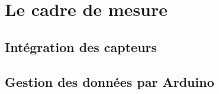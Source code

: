 \chapter{Le cadre de mesure}

\section{Intégration des capteurs}

\section{Gestion des données par Arduino}